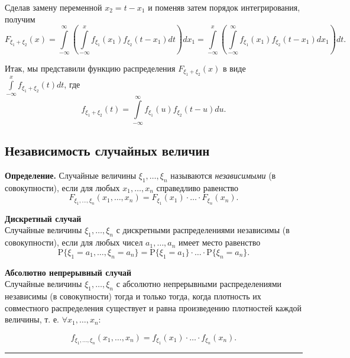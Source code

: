 \documentclass[11pt,a4paper]{article}
\begin{document}
Сделав замену переменной \(x_2 = t - x_1\) и поменяв затем порядок
интегрирования, получим \[
  F_{\xi_1 +\xi_2}(x) = \int\limits_{-\infty}^{\infty} \left( \int\limits_{-\infty}^{x} f_{\xi_1}(x_1) f_{\xi_2}(t-x_1) dt \right) dx_1
  = \int\limits_{-\infty}^{x} \left( \int\limits_{-\infty}^{\infty} f_{\xi_1}(x_1) f_{\xi_2}(t-x_1) dx_1 \right) dt.
\]

Итак, мы представили функцию распределения \(F_{\xi_1 +\xi_2}(x)\) в
виде \(\int\limits_{-\infty}^{x} f_{\xi_1+\xi_2}(t)dt\), где \[
  f_{\xi_1+\xi_2}(t) = \int\limits_{-\infty}^{\infty} f_{\xi_1}(u) f_{\xi_2}(t-u) du.
\]

    \hypertarget{ux43dux435ux437ux430ux432ux438ux441ux438ux43cux43eux441ux442ux44c-ux441ux43bux443ux447ux430ux439ux43dux44bux445-ux432ux435ux43bux438ux447ux438ux43d}{%
\subsection{Независимость случайных
величин}\label{ux43dux435ux437ux430ux432ux438ux441ux438ux43cux43eux441ux442ux44c-ux441ux43bux443ux447ux430ux439ux43dux44bux445-ux432ux435ux43bux438ux447ux438ux43d}}

\textbf{Определение.} Случайные величины \(\xi_1, \dots, \xi_n\)
называются \emph{независимыми} (в совокупности), если для любых
\(x_1, \dots, x_n\) справедливо равенство
\[ F_{\xi_1, \dots, \xi_n}(x_1, \dots, x_n) = F_{\xi_1}(x_1) \cdot \ldots \cdot F_{\xi_n}(x_n).\]

\textbf{Дискретный случай}\\
Случайные величины \(\xi_1, \dots, \xi_n\) с дискретными распределениями
независимы (в совокупности), если для любых чисел \(a_1, \dots , a_n\)
имеет место равенство
\[ \mathrm{P}\{\xi_1=a_1, \dots, \xi_n=a_n\} = \mathrm{P}\{\xi_1=a_1\} \cdot \ldots \cdot \mathrm{P}\{\xi_n=a_n\}.\]

\textbf{Абсолютно непрерывный случай}\\
Случайные величины \(\xi_1, \dots, \xi_n\) с абсолютно непрерывными
распределениями независимы (в совокупности) тогда и только тогда, когда
плотность их совместного распределения существует и равна произведению
плотностей каждой величины, т. е. \(\forall x_1, \dots , x_n\):

\[ f_{\xi_1, \dots, \xi_n}(x_1, \dots, x_n) = f_{\xi_1}(x_1) \cdot \ldots \cdot f_{\xi_n}(x_n). \]

    \begin{center}\rule{0.5\linewidth}{0.5pt}\end{center}
\end{document}
